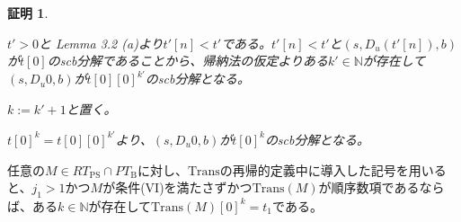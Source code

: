 \documentclass[dvipdfmx,uplatex]{jsarticle}
\theoremstyle{customnonumberbreakfortheorem}
\theoremstyle{customnonumberbreakforproof}
\newtheorem{hideableproof}{証明}
\begin{document}
\begin{hideableproof}
\begin{indented}
\begin{indented}
\begin{indented}
				\item \(t' > 0\)と\cite{buc1} Lemma 3.2 (a)より\(t'[n] < t'\)である。\(t'[n] < t'\)と\((s,D_u(t'[n]),b)\)が\(t[0]\)のscb分解であることから、帰納法の仮定よりある\(k' \in \mathbb{N}\)が存在して\((s,D_u 0,b)\)が\(t[0][0]^{k'}\)のscb分解となる。
			\end{indented}
			\item \(k := k'+1\)と置く。
			\item \(t[0]^k = t[0][0]^{k'}\)より、\((s,D_u 0,b)\)が\(t[0]^k\)のscb分解となる。
		\end{indented}
	\end{indented}
\end{hideableproof}

\begin{lemma}\label{Predと0の関係}
	任意の\(M \in RT_{\textrm{PS}} \cap PT_{\textrm{B}}\)に対し、\(\textrm{Trans}\)の再帰的定義中に導入した記号を用いると、\(j_1 > 1\)かつ\(M\)が条件(VI)を満たさず\footnotemark{}かつ\(\textrm{Trans}(M)\)が順序数項であるならば、ある\(k \in \mathbb{N}\)が存在して\(\textrm{Trans}(M)[0]^k = t_1\)である。
\end{lemma}
\end{document}
